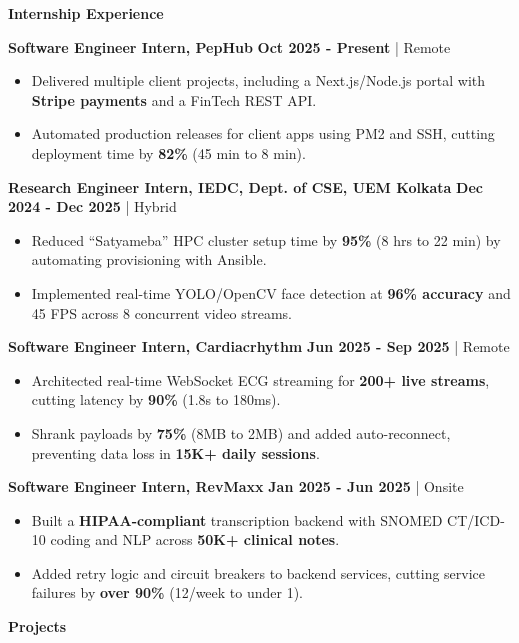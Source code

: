 \documentclass[10pt,a4paper]{article}
\newcommand{\heading}[1]{{\carlito #1}}
\newcommand{\cvsection}[1]{%
  \par\vspace{10pt}%
  {\heading{\color{sectioncolor}\large\bfseries #1}}\par\vspace{2pt}}
\newenvironment{cvbullets}{\begin{itemize}\setlength{\parfillskip}{0pt}}{\end{itemize}}
\newcommand{\cvrole}[4]{%
  \par\vspace{5pt}%
  \textbf{#2, #1} \hfill {\color{sectioncolor}\textbf{#3}} | #4\par}
\begin{document}
\cvsection{Internship Experience}

\cvrole{PepHub}{Software Engineer Intern}{Oct 2025 - Present}{Remote}
\begin{cvbullets}
  \item Delivered multiple client projects, including a Next.js/Node.js portal with \textbf{Stripe payments} and a FinTech REST API.
  \item Automated production releases for client apps using PM2 and SSH, cutting deployment time by \textbf{82\%} (45 min to 8 min).
\end{cvbullets}

\cvrole{IEDC, Dept. of CSE, UEM Kolkata}{Research Engineer Intern}{Dec 2024 - Dec 2025}{Hybrid}
\begin{cvbullets}
  \item Reduced ``Satyameba'' HPC cluster setup time by \textbf{95\%} (8 hrs to 22 min) by automating provisioning with Ansible.
  \item Implemented real-time YOLO/OpenCV face detection at \textbf{96\% accuracy} and 45 FPS across 8 concurrent video streams.
\end{cvbullets}

\cvrole{Cardiacrhythm}{Software Engineer Intern}{Jun 2025 - Sep 2025}{Remote}
\begin{cvbullets}
  \item Architected real-time WebSocket ECG streaming for \textbf{200+ live streams}, cutting latency by \textbf{90\%} (1.8s to 180ms).
  \item Shrank payloads by \textbf{75\%} (8MB to 2MB) and added auto-reconnect, preventing data loss in \textbf{15K+ daily sessions}.
\end{cvbullets}

\cvrole{RevMaxx}{Software Engineer Intern}{Jan 2025 - Jun 2025}{Onsite}
\begin{cvbullets}
  \item Built a \textbf{HIPAA-compliant} transcription backend with SNOMED CT/ICD-10 coding and NLP across \textbf{50K+ clinical notes}.
  \item Added retry logic and circuit breakers to backend services, cutting service failures by \textbf{over 90\%} (12/week to under 1).
\end{cvbullets}

\cvsection{Projects}
\end{document}
